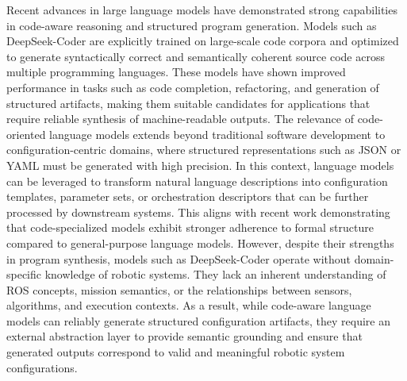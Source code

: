Recent advances in large language models have demonstrated strong capabilities in code-aware reasoning and structured program generation. Models 
such as DeepSeek-Coder are explicitly trained on large-scale code corpora and optimized to generate syntactically correct and semantically coherent
source code across multiple programming languages. These models have shown improved performance in tasks such as code completion, refactoring, and 
generation of structured artifacts, making them suitable candidates for applications that require reliable synthesis of machine-readable outputs.
The relevance of code-oriented language models extends beyond traditional software development to configuration-centric domains, where structured 
representations such as JSON or YAML must be generated with high precision. In this context, language models can be leveraged to transform natural
language descriptions into configuration templates, parameter sets, or orchestration descriptors that can be further processed by downstream systems.
This aligns with recent work demonstrating that code-specialized models exhibit stronger adherence to formal structure compared to general-purpose 
language models. However, despite their strengths in program synthesis, models such as DeepSeek-Coder operate without domain-specific knowledge of 
robotic systems. They lack an inherent understanding of ROS concepts, mission semantics, or the relationships between sensors, algorithms, and 
execution contexts. As a result, while code-aware language models can reliably generate structured configuration artifacts, they require an external
abstraction layer to provide semantic grounding and ensure that generated outputs correspond to valid and meaningful robotic system configurations.
